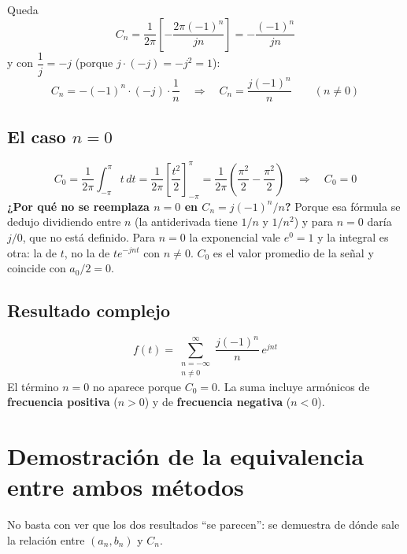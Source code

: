 \documentclass[11pt,a4paper]{article}
\begin{document}
Queda
\begin{equation*}
  C_n=\frac{1}{2\pi}\left[-\frac{2\pi(-1)^{n}}{jn}\right]=-\frac{(-1)^{n}}{jn}
\end{equation*}
y con $\dfrac{1}{j}=-j$ (porque $j\cdot(-j)=-j^{2}=1$):
\begin{equation*}
  C_n=-(-1)^{n}\cdot(-j)\cdot\frac{1}{n}
  \quad\Longrightarrow\quad
  \boxed{C_n=\frac{j(-1)^{n}}{n}\qquad (n\neq 0)}
\end{equation*}

\subsection{El caso \texorpdfstring{$n=0$}{n=0}}\label{sec:c0}
\begin{equation*}
  C_0=\frac{1}{2\pi}\int_{-\pi}^{\pi}t\,dt=\frac{1}{2\pi}\left[\frac{t^{2}}{2}\right]_{-\pi}^{\pi}
  =\frac{1}{2\pi}\left(\frac{\pi^{2}}{2}-\frac{\pi^{2}}{2}\right)
  \quad\Longrightarrow\quad\boxed{C_0=0}
\end{equation*}
\textbf{¿Por qué no se reemplaza $n=0$ en $C_n=j(-1)^{n}/n$?} Porque esa fórmula se
dedujo dividiendo entre $n$ (la antiderivada tiene $1/n$ y $1/n^{2}$) y para $n=0$ daría
$j/0$, que no está definido. Para $n=0$ la exponencial vale $e^{0}=1$ y la integral es otra:
la de $t$, no la de $te^{-jnt}$ con $n\neq 0$. $C_0$ es el valor promedio de la señal y
coincide con $a_0/2=0$.

\subsection{Resultado complejo}
\begin{equation*}
  \boxed{f(t)=\sum_{\substack{n=-\infty\\ n\neq 0}}^{\infty}\frac{j(-1)^{n}}{n}\,e^{jnt}}
\end{equation*}
El término $n=0$ no aparece porque $C_0=0$. La suma incluye armónicos de
\textbf{frecuencia positiva} ($n>0$) y de \textbf{frecuencia negativa} ($n<0$).

\FloatBarrier
\section{Demostración de la equivalencia entre ambos métodos}\label{sec:equivalencia}
No basta con ver que los dos resultados ``se parecen'': se demuestra de dónde sale la
relación entre $(a_n,b_n)$ y $C_n$.
\end{document}
